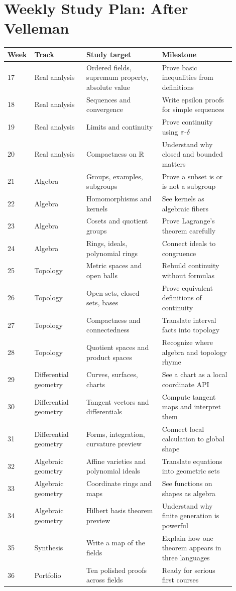 \documentclass[11pt]{article}
\begin{document}
\section{Weekly Study Plan: After Velleman}

\begin{longtable}{p{0.05\linewidth}p{0.22\linewidth}p{0.32\linewidth}p{0.31\linewidth}}
\toprule
Week & Track & Study target & Milestone \\
\midrule
17 & Real analysis & Ordered fields, supremum property, absolute value & Prove basic inequalities from definitions \\
18 & Real analysis & Sequences and convergence & Write epsilon proofs for simple sequences \\
19 & Real analysis & Limits and continuity & Prove continuity using $\varepsilon$-$\delta$ \\
20 & Real analysis & Compactness on $\mathbb{R}$ & Understand why closed and bounded matters \\
21 & Algebra & Groups, examples, subgroups & Prove a subset is or is not a subgroup \\
22 & Algebra & Homomorphisms and kernels & See kernels as algebraic fibers \\
23 & Algebra & Cosets and quotient groups & Prove Lagrange's theorem carefully \\
24 & Algebra & Rings, ideals, polynomial rings & Connect ideals to congruence \\
25 & Topology & Metric spaces and open balls & Rebuild continuity without formulas \\
26 & Topology & Open sets, closed sets, bases & Prove equivalent definitions of continuity \\
27 & Topology & Compactness and connectedness & Translate interval facts into topology \\
28 & Topology & Quotient spaces and product spaces & Recognize where algebra and topology rhyme \\
29 & Differential geometry & Curves, surfaces, charts & See a chart as a local coordinate API \\
30 & Differential geometry & Tangent vectors and differentials & Compute tangent maps and interpret them \\
31 & Differential geometry & Forms, integration, curvature preview & Connect local calculation to global shape \\
32 & Algebraic geometry & Affine varieties and polynomial ideals & Translate equations into geometric sets \\
33 & Algebraic geometry & Coordinate rings and maps & See functions on shapes as algebra \\
34 & Algebraic geometry & Hilbert basis theorem preview & Understand why finite generation is powerful \\
35 & Synthesis & Write a map of the fields & Explain how one theorem appears in three languages \\
36 & Portfolio & Ten polished proofs across fields & Ready for serious first courses \\
\bottomrule
\end{longtable}
\end{document}
